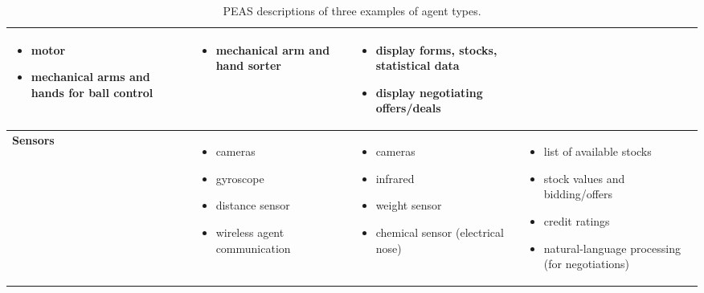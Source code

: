 \begin{table}[htpb]
{{\begin{tabular}{l p{5cm} p{5cm} p{5cm}}
\begin{itemize}[leftmargin=*,topsep=0pt,noitemsep]
\item motor
\item mechanical arms and hands for ball control
\end{itemize} & 

\begin{itemize}[leftmargin=*,topsep=0pt,noitemsep]
\item mechanical arm and hand sorter
\end{itemize} & 

\begin{itemize}[leftmargin=*,topsep=0pt,noitemsep]
\item display forms, stocks, statistical data
\item display negotiating offers/deals
\end{itemize} \\
\hline
\up \textbf{Sensors} & 



\begin{itemize}[leftmargin=*,topsep=0pt,noitemsep]
\item cameras
\item gyroscope
\item distance sensor
\item wireless agent communication
\end{itemize} & 

\begin{itemize}[leftmargin=*,topsep=0pt,noitemsep]
\item cameras
\item infrared
\item weight sensor
\item chemical sensor (electrical nose)
\end{itemize} & 

\begin{itemize}[leftmargin=*,topsep=0pt,noitemsep]
\item list of available stocks
\item stock values and bidding/offers
\item credit ratings
\item natural-language processing (for negotiations)
\end{itemize} \\
\hline
\end{tabular}}
}
\caption{PEAS descriptions of three examples of agent types.}
\label{table:peas}
\end{table}